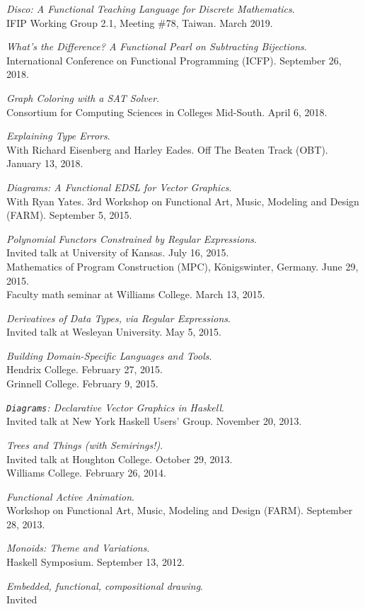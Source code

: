 \documentclass[12pt]{article}
\newcommand{\cvitem}{\par\hangpara{2em}{1}}
\begin{document}
\cvitem \emph{Disco: A Functional Teaching Language for Discrete
  Mathematics}. \\ IFIP Working Group 2.1, Meeting \#78, Taiwan. March 2019.
\cvitem \emph{What's the Difference? A Functional Pearl on Subtracting
    Bijections}. \\ International Conference on Functional Programming
    (ICFP). September 26, 2018.
\cvitem \emph{Graph Coloring with a SAT Solver}. \\
    Consortium for Computing Sciences in Colleges Mid-South.  April 6, 2018.
\cvitem \emph{Explaining Type Errors}. \\
    With Richard Eisenberg and Harley Eades.  Off The Beaten Track
    (OBT). January 13, 2018.
\cvitem \emph{Diagrams: A Functional EDSL for Vector Graphics}. \\
    With Ryan Yates. 3rd Workshop on Functional
    Art, Music, Modeling and Design (FARM).  September 5, 2015.
\cvitem \emph{Polynomial Functors Constrained by Regular
    Expressions}. \\ Invited talk at University of Kansas. July 16, 2015.
    \\ Mathematics of Program Construction (MPC),
    K\"onigswinter, Germany. June 29, 2015.
    \\ Faculty math seminar at Williams College. March 13, 2015.
\cvitem \emph{Derivatives of Data Types, via Regular
    Expressions}. \\ Invited talk at Wesleyan University. May 5, 2015.
\cvitem \emph{Building Domain-Specific Languages and Tools}. \\
    Hendrix College. February 27, 2015. \\
    Grinnell College. February 9, 2015.
\cvitem \emph{\texttt{Diagrams}: Declarative Vector Graphics in
    Haskell}. \\ Invited talk at New York Haskell Users' Group. November
    20, 2013.
\cvitem \emph{Trees and Things (with Semirings!)}. \\ Invited talk at Houghton
    College. October 29, 2013. \\
    Williams College. February 26, 2014.
\cvitem \emph{Functional Active Animation}. \\ Workshop on Functional
    Art, Music, Modeling and Design (FARM).  September 28, 2013.
\cvitem \emph{Monoids: Theme and Variations}. \\ Haskell Symposium.
    September 13, 2012.
\cvitem \emph{Embedded, functional, compositional drawing}. \\ Invited
\end{document}
